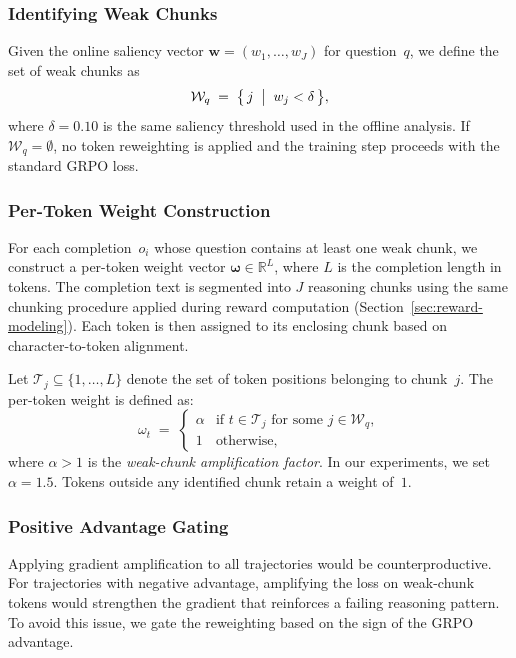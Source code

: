 \documentclass[12pt]{report}
\begin{document}
\subsubsection{Identifying Weak Chunks}

Given the online saliency vector $\mathbf{w} = (w_1, \ldots, w_J)$ for
question~$q$, we define the set of weak chunks as
\begin{equation}
  \mathcal{W}_q \;=\; \bigl\{\, j \;\bigm|\; w_j < \delta \,\bigr\},
  \label{eq:weak-set-online}
\end{equation}
where $\delta = 0.10$ is the same saliency threshold used in the offline
analysis.  If $\mathcal{W}_q = \emptyset$, no token reweighting is applied
and the training step proceeds with the standard GRPO loss.

\subsubsection{Per-Token Weight Construction}

For each completion~$o_i$ whose question contains at least one weak chunk,
we construct a per-token weight vector
$\boldsymbol{\omega} \in \mathbb{R}^{L}$, where $L$ is the completion
length in tokens.  The completion text is segmented into $J$ reasoning
chunks using the same chunking procedure applied during reward computation
(Section~\ref{sec:reward-modeling}).  Each token is then assigned to its
enclosing chunk based on character-to-token alignment.

Let $\mathcal{T}_j \subseteq \{1, \ldots, L\}$ denote the set of token
positions belonging to chunk~$j$.  The per-token weight is defined as:
\begin{equation}
  \omega_t \;=\;
  \begin{cases}
    \alpha & \text{if } t \in \mathcal{T}_j \text{ for some } j \in \mathcal{W}_q, \\[4pt]
    1 & \text{otherwise},
  \end{cases}
  \label{eq:per-token-weight}
\end{equation}
where $\alpha > 1$ is the \emph{weak-chunk amplification factor}.  In our
experiments, we set $\alpha = 1.5$.  Tokens outside any identified chunk retain a weight of~$1$.

\subsubsection{Positive Advantage Gating}

Applying gradient amplification to all trajectories would be counterproductive. 
For trajectories with negative advantage, amplifying the loss on weak-chunk tokens would strengthen the gradient that reinforces a failing reasoning pattern. 
To avoid this issue, we gate the reweighting based on the sign of the GRPO advantage.
\end{document}
